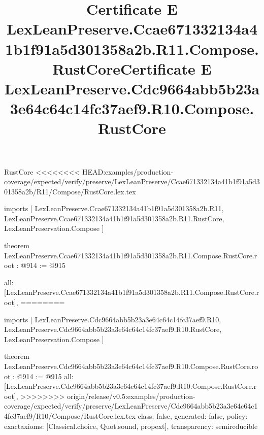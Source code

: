 \begin{lexlean}{RustCore}
<<<<<<<< HEAD:examples/production-coverage/expected/verify/preserve/LexLeanPreserve/Ccae671332134a41b1f91a5d301358a2b/R11/Compose/RustCore.lex.tex
\title{Certificate E LexLeanPreserve.Ccae671332134a41b1f91a5d301358a2b.R11.Compose.RustCore}
\begin{coremodule}
imports [
  LexLeanPreserve.Ccae671332134a41b1f91a5d301358a2b.R11,
  LexLeanPreserve.Ccae671332134a41b1f91a5d301358a2b.R11.RustCore,
  LexLeanPreservation.Compose
]

theorem LexLeanPreserve.Ccae671332134a41b1f91a5d301358a2b.R11.Compose.RustCore.root : @914 := @915 {
  all: [LexLeanPreserve.Ccae671332134a41b1f91a5d301358a2b.R11.Compose.RustCore.root],
========
\title{Certificate E LexLeanPreserve.Cdc9664abb5b23a3e64c64c14fc37aef9.R10.Compose.RustCore}
\begin{coremodule}
imports [
  LexLeanPreserve.Cdc9664abb5b23a3e64c64c14fc37aef9.R10,
  LexLeanPreserve.Cdc9664abb5b23a3e64c64c14fc37aef9.R10.RustCore,
  LexLeanPreservation.Compose
]

theorem LexLeanPreserve.Cdc9664abb5b23a3e64c64c14fc37aef9.R10.Compose.RustCore.root : @914 := @915 {
  all: [LexLeanPreserve.Cdc9664abb5b23a3e64c64c14fc37aef9.R10.Compose.RustCore.root],
>>>>>>>> origin/release/v0.5:examples/production-coverage/expected/verify/preserve/LexLeanPreserve/Cdc9664abb5b23a3e64c64c14fc37aef9/R10/Compose/RustCore.lex.tex
  class: false,
  generated: false,
  policy: exact{axioms: [Classical.choice, Quot.sound, propext]},
  transparency: semireducible
}


\end{coremodule}}
\end{coremodule}
\end{lexlean}
